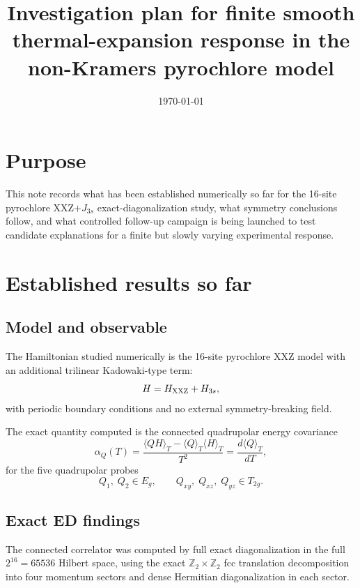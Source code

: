\documentclass[11pt]{article}
\title{Investigation plan for finite smooth thermal-expansion response in the non-Kramers pyrochlore model}
\author{}
\date{\today}
\begin{document}
\maketitle

\section{Purpose}

This note records what has been established numerically so far for the
16-site pyrochlore XXZ$+J_{3s}$ exact-diagonalization study, what symmetry
conclusions follow, and what controlled follow-up campaign is being launched
to test candidate explanations for a finite but slowly varying experimental
response.

\section{Established results so far}

\subsection{Model and observable}

The Hamiltonian studied numerically is the 16-site pyrochlore XXZ model with
an additional trilinear Kadowaki-type term:
\begin{equation}
H = H_{\rm XXZ} + H_{3s},
\end{equation}
with periodic boundary conditions and no external symmetry-breaking field.

The exact quantity computed is the connected quadrupolar energy covariance
\begin{equation}
\alpha_Q(T)
=
\frac{\langle QH\rangle_T - \langle Q\rangle_T \langle H\rangle_T}{T^2}
=
\frac{d\langle Q\rangle_T}{dT},
\end{equation}
for the five quadrupolar probes
\begin{equation}
Q_1,\; Q_2 \in E_g,
\qquad
Q_{xy},\; Q_{xz},\; Q_{yz} \in T_{2g}.
\end{equation}

\subsection{Exact ED findings}

The connected correlator was computed by full exact diagonalization in the full
$2^{16}=65536$ Hilbert space, using the exact $\mathbb Z_2\times\mathbb Z_2$
fcc translation decomposition into four momentum sectors and dense Hermitian
diagonalization in each sector.
\end{document}
